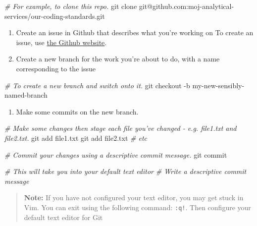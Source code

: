 \documentclass[]{book}
\newenvironment{Shaded}{\begin{snugshade}}{\end{snugshade}}
\newcommand{\CommentTok}[1]{\textcolor[rgb]{0.56,0.35,0.01}{\textit{#1}}}
\newcommand{\FunctionTok}[1]{\textcolor[rgb]{0.00,0.00,0.00}{#1}}
\newcommand{\NormalTok}[1]{#1}
\providecommand{\tightlist}{%
  \setlength{\itemsep}{0pt}\setlength{\parskip}{0pt}}
\begin{document}
\begin{Shaded}
\begin{Highlighting}[]
\CommentTok{# For example, to clone this repo.}
\FunctionTok{git}\NormalTok{ clone git@github.com:moj-analytical-services/our-coding-standards.git}
\end{Highlighting}
\end{Shaded}

\begin{enumerate}
\def\labelenumi{\arabic{enumi}.}
\setcounter{enumi}{1}
\item
  Create an issue in Github that describes what you're working on
  To create an issue, use \href{https://guides.github.com/features/issues/}{the Github website}.
\item
  Create a new branch for the work you're about to do, with a name corresponding to the issue
\end{enumerate}

\begin{Shaded}
\begin{Highlighting}[]
\CommentTok{# To create a new branch and switch onto it.}
\FunctionTok{git}\NormalTok{ checkout -b my-new-sensibly-named-branch}
\end{Highlighting}
\end{Shaded}

\begin{enumerate}
\def\labelenumi{\arabic{enumi}.}
\setcounter{enumi}{3}
\tightlist
\item
  Make some commits on the new branch.
\end{enumerate}

\begin{Shaded}
\begin{Highlighting}[]
\CommentTok{# Make some changes then stage each file you've changed - e.g. file1.txt and file2.txt.}
\FunctionTok{git}\NormalTok{ add file1.txt}
\FunctionTok{git}\NormalTok{ add file2.txt}
\CommentTok{# etc}

\CommentTok{# Commit your changes using a descriptive commit message.}
\FunctionTok{git}\NormalTok{ commit}

\CommentTok{# This will take you into your default text editor}
\CommentTok{# Write a descriptive commit message}
\end{Highlighting}
\end{Shaded}

\begin{quote}
\textbf{Note:}
If you have not configured your text editor, you may get stuck in Vim. You can exit using the following command: \texttt{:q!}. Then configure your default text editor for Git
\end{quote}
\end{document}
